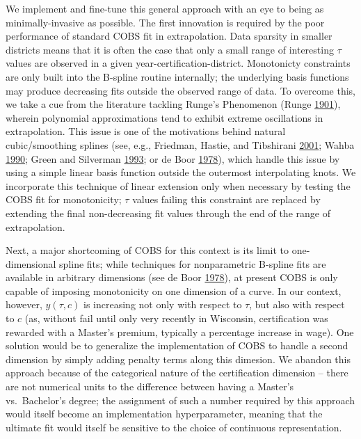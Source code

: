 \documentclass[]{article}
\begin{document}
We implement and fine-tune this general approach with an eye to being as
minimally-invasive as possible. The first innovation is required by the
poor performance of standard COBS fit in extrapolation. Data sparsity in
smaller districts means that it is often the case that only a small
range of interesting \(\tau\) values are observed in a given
year-certification-district. Monotonicty constraints are only built into
the B-spline routine internally; the underlying basis functions may
produce decreasing fits outside the observed range of data. To overcome
this, we take a cue from the literature tackling Runge's Phenomenon
(Runge \protect\hyperlink{ref-runge}{1901}), wherein polynomial
approximations tend to exhibit extreme oscillations in extrapolation.
This issue is one of the motivations behind natural cubic/smoothing
splines (see, e.g., Friedman, Hastie, and Tibshirani
\protect\hyperlink{ref-friedman}{2001}; Wahba
\protect\hyperlink{ref-wahba}{1990}; Green and Silverman
\protect\hyperlink{ref-green}{1993}; or de Boor
\protect\hyperlink{ref-deboor}{1978}), which handle this issue by using
a simple linear basis function outside the outermost interpolating
knots. We incorporate this technique of linear extension only when
necessary by testing the COBS fit for monotonicity; \(\tau\) values
failing this constraint are replaced by extending the final
non-decreasing fit values through the end of the range of extrapolation.

Next, a major shortcoming of COBS for this context is its limit to
one-dimensional spline fits; while techniques for nonparametric B-spline
fits are available in arbitrary dimensions (see de Boor
\protect\hyperlink{ref-deboor}{1978}), at present COBS is only capable
of imposing monotonicity on one dimension of a curve. In our context,
however, \(y(\tau, c)\) is increasing not only with respect to \(\tau\),
but also with respect to \(c\) (as, without fail until only very
recently in Wisconsin, certification was rewarded with a Master's
premium, typically a percentage increase in wage). One solution would be
to generalize the implementation of COBS to handle a second dimension by
simply adding penalty terms along this dimesion. We abandon this
approach because of the categorical nature of the certification
dimension -- there are not numerical units to the difference between
having a Master's vs.~Bachelor's degree; the assignment of such a number
required by this approach would itself become an implementation
hyperparameter, meaning that the ultimate fit would itself be sensitive
to the choice of continuous representation.
\end{document}
